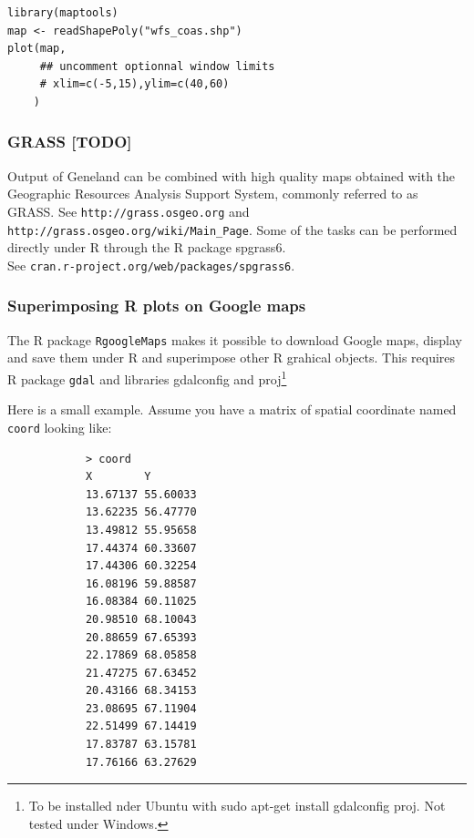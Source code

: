 \documentclass[a4paper,10pt]{article}
\begin{document}
{\footnotesize  
\begin{verbatim}
library(maptools)
map <- readShapePoly("wfs_coas.shp")
plot(map,
     ## uncomment optionnal window limits
     # xlim=c(-5,15),ylim=c(40,60)
    )
\end{verbatim} }




\subsubsection{GRASS [TODO]}
Output of {\sc Geneland} can be combined with 
high quality maps obtained with the Geographic Resources Analysis Support System, commonly referred to as GRASS. 
See \texttt{http://grass.osgeo.org} and\\ \texttt{http://grass.osgeo.org/wiki/Main\_Page}.
Some of the tasks can be performed directly under R through the R package spgrass6.\\ 
See \texttt{cran.r-project.org/web/packages/spgrass6}.


\subsubsection[R plots and GoogleMaps]{Superimposing R plots on Google maps}

The R package {\tt RgoogleMaps} makes it possible to download Google maps, display and save them under R and superimpose 
other R grahical objects. This requires R package {\tt gdal} and libraries gdalconfig and proj\footnote{To be installed 
nder Ubuntu with sudo apt-get install gdalconfig proj. Not tested under Windows.}

Here is a small example. Assume you have a matrix of spatial coordinate named {\tt coord} looking like:\\

\begin{verbatim}
            > coord
            X        Y
            13.67137 55.60033
            13.62235 56.47770
            13.49812 55.95658
            17.44374 60.33607
            17.44306 60.32254
            16.08196 59.88587
            16.08384 60.11025
            20.98510 68.10043
            20.88659 67.65393
            22.17869 68.05858
            21.47275 67.63452
            20.43166 68.34153
            23.08695 67.11904
            22.51499 67.14419
            17.83787 63.15781
            17.76166 63.27629
\end{verbatim}
\end{document}
